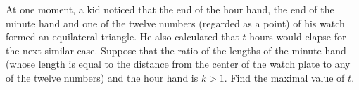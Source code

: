 At one moment, a kid noticed that the end of the hour hand, the end of the minute hand and one of the twelve numbers (regarded as a point) of his watch formed an equilateral triangle. He also calculated that $t$ hours would elapse for the next similar case. Suppose that the ratio of the lengths of the minute hand (whose length is equal to the distance from the center of the watch plate to any of the twelve numbers) and the hour hand is $k>1$. Find the maximal value of $t$.